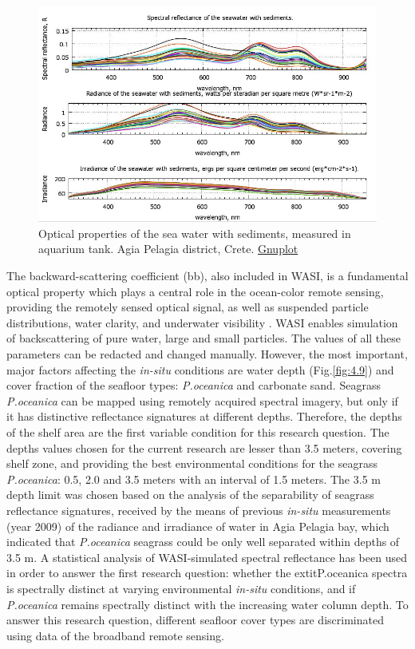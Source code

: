 \documentclass[11pt]{article}
\begin{document}
\begin{figure}[H]
	\centering
	\includegraphics[scale=0.5]{GNU-17.jpg}
	\caption{Optical properties of the sea water with sediments, measured in aquarium tank. Agia Pelagia district, Crete. \href{http://www.gnuplot.info/}				{Gnuplot}}\label{fig:4.2}
\end{figure}

The backward-scattering coefficient (bb), also included in WASI, is a
fundamental optical property which plays a central role in the ocean-color remote sensing, providing
the remotely sensed optical signal, as well as suspended particle distributions, water clarity, and
underwater visibility \cite{Maffione97}\label{Maffione97}. WASI enables simulation of backscattering of pure
water, large and small particles. The values of all these parameters can be redacted and changed
manually. However, the most important, major factors affecting the \textit{in-situ} conditions are water depth (Fig.\ref{fig:4.9})
and cover fraction of the seafloor types: \textit{P.oceanica} and carbonate sand.
Seagrass \textit{P.oceanica} can be mapped using remotely acquired spectral imagery, but only if it has distinctive
reflectance signatures at different depths. Therefore, the depths of the shelf area are the first variable
condition for this research question. The depths values chosen for the current research are lesser than
3.5 meters, covering shelf zone, and providing the best environmental conditions for the seagrass
\textit{P.oceanica}: 0.5, 2.0 and 3.5 meters with an interval of 1.5 meters. 
The 3.5 m depth limit was chosen based on the analysis of the separability of seagrass reflectance signatures, received by the means of
previous \textit{in-situ} measurements (year 2009) of the radiance and irradiance of water in Agia Pelagia
bay, which indicated that \textit{P.oceanica} seagrass could be only well separated within depths of 3.5 m.
A statistical analysis of WASI-simulated spectral reflectance has been used in order to answer the first
research question: whether the 	extit{P.oceanica} spectra is spectrally distinct at varying environmental \textit{in-situ}
conditions, and if \textit{P.oceanica} remains spectrally distinct with the increasing water column depth.
To answer this research question, different seafloor cover types are discriminated using data of the
broadband remote sensing.
\end{document}
